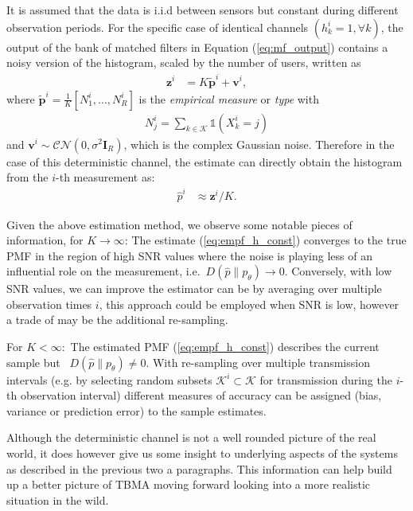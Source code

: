 \documentclass{article}
\begin{document}
It is assumed that the data is i.i.d between sensors but constant during different observation periods. For the specific case of identical channels ${(h^i_k = 1, \forall k)}$, the output of the bank of matched filters in Equation (\ref{eq:mf_output}) contains a noisy version of the histogram, scaled by the number of users, written as
%
\begin{align}
    \boldsymbol{z}^i &= K \tilde{\boldsymbol{p}}^i + \boldsymbol{v}^i, 
\end{align}
%
where $\tilde{\boldsymbol{p}}^i = \frac{1}{K}[N_1^i, \ldots, N_R^i]$ is the \emph{empirical measure} or \emph{type} with
\begin{align}
    N_j^i = \sum_{k \in \mathcal{K}}\mathbb{1}(X^i_k = j)
\end{align}
and $\boldsymbol{v}^i \sim \mathcal{CN}(0, {\sigma^2 \boldsymbol{I}_R})$, which is the complex Gaussian noise.
%
Therefore in the case of this deterministic channel, the estimate can directly obtain the histogram from the $i$-th measurement as:
%
\begin{align}
    \hat{p}^i &\approx \boldsymbol{z}^i / K. \label{eq:empf_h_const}
\end{align}

Given the above estimation method, we observe some notable pieces of information, for $K \rightarrow \infty$: The estimate (\ref{eq:empf_h_const}) converges to the true PMF in the region of high SNR values where the noise is playing less of an influential role on the measurement, i.e.~$D(\hat{p}\| p_{\theta}) \rightarrow 0$. Conversely, with low SNR values, we can improve the estimator can be by averaging over multiple observation times $i$, this approach could be employed when SNR is low, however a trade of may be the additional re-sampling. 

For $K <\infty:$ The estimated PMF (\ref{eq:empf_h_const}) describes the current sample but ~$D(\hat{p}\| p_{\theta}) \neq 0$. With re-sampling over multiple transmission intervals (e.g. by selecting random subsets $\mathcal{K}^i \subset \mathcal{K}$ for transmission during the $i$-th observation interval) different measures of accuracy can be assigned (bias, variance or prediction error) to the sample estimates.

Although the deterministic channel is not a well rounded picture of the real world, it does however give us some insight to underlying aspects of the systems as described in the previous two a paragraphs. This information can help build up a better picture of TBMA moving forward looking into a more realistic situation in the wild.
\end{document}
